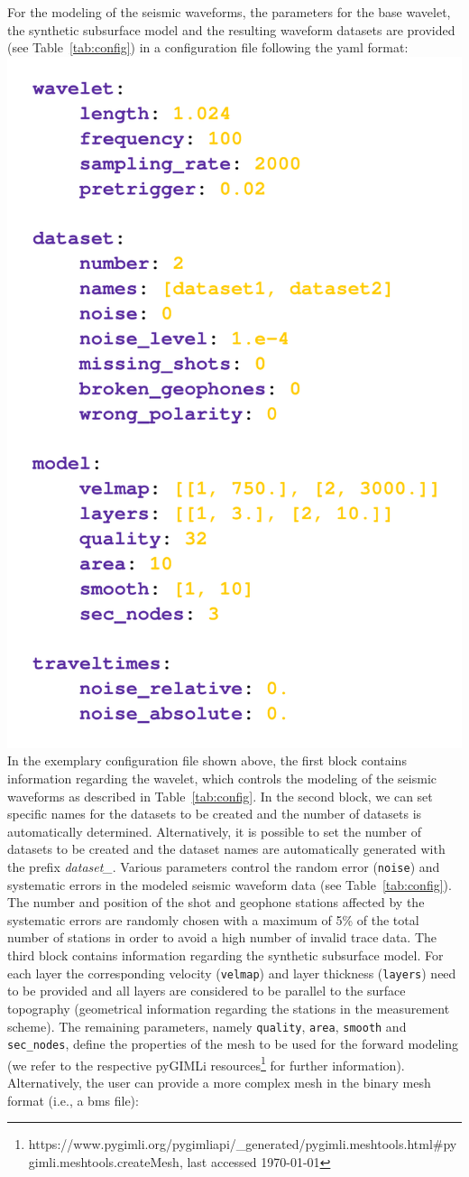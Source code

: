 \documentclass[a4paper,fleqn]{cas-sc}
\begin{document}
For the modeling of the seismic waveforms, the parameters for the base wavelet, the synthetic subsurface model and the resulting waveform datasets are provided (see Table~\ref{tab:config}) in a configuration file following the yaml format:
\newline
\includegraphics[width=.3\textwidth]{./figures/yaml_file.pdf}
\newline
In the exemplary configuration file shown above, the first block contains information regarding the wavelet, which controls the modeling of the seismic waveforms as described in Table~\ref{tab:config}.
In the second block, we can set specific names for the datasets to be created and the number of datasets is automatically determined. Alternatively, it is possible to set the number of datasets to be created and the dataset names are automatically generated with the prefix \textit{dataset\_}.
Various parameters control the random error (\texttt{noise}) and systematic errors in the modeled seismic waveform data (see Table~\ref{tab:config}).
The number and position of the shot and geophone stations affected by the systematic errors are randomly chosen with a maximum of 5\% of the total number of stations in order to avoid a high number of invalid trace data.
The third block contains information regarding the synthetic subsurface model. For each layer the corresponding velocity (\texttt{velmap}) and layer thickness (\texttt{layers}) need to be provided and all layers are considered to be parallel to the surface topography (geometrical information regarding the stations in the measurement scheme). The remaining parameters, namely \texttt{quality}, \texttt{area}, \texttt{smooth} and \texttt{sec\_nodes}, define the properties of the mesh to be used for the forward modeling (we refer to the respective pyGIMLi resources\footnote{https://www.pygimli.org/pygimliapi/\_generated/pygimli.meshtools.html\#pygimli.meshtools.createMesh, last accessed \today} for further information).
Alternatively, the user can provide a more complex mesh in the binary mesh format (i.e., a bms file):
\end{document}
